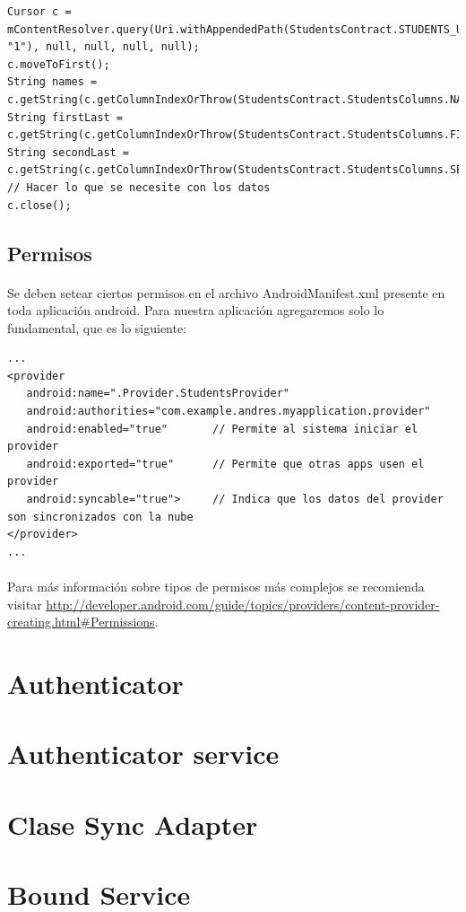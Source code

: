 \documentclass[10pt]{extarticle}
\begin{document}
\begin{lstlisting}
Cursor c = mContentResolver.query(Uri.withAppendedPath(StudentsContract.STUDENTS_URI, "1"), null, null, null, null);
c.moveToFirst();
String names = c.getString(c.getColumnIndexOrThrow(StudentsContract.StudentsColumns.NAMES));
String firstLast = c.getString(c.getColumnIndexOrThrow(StudentsContract.StudentsColumns.FIRST_LASTNAME));
String secondLast = c.getString(c.getColumnIndexOrThrow(StudentsContract.StudentsColumns.SECOND_LASTNAME));
// Hacer lo que se necesite con los datos
c.close();

\end{lstlisting}


\subsection{Permisos}

\paragraph{}
Se deben setear ciertos permisos en el archivo AndroidManifest.xml presente en toda aplicación android. Para nuestra aplicación agregaremos solo lo fundamental, que es lo siguiente:

\begin{lstlisting}
...
<provider
   android:name=".Provider.StudentsProvider"
   android:authorities="com.example.andres.myapplication.provider"
   android:enabled="true"		// Permite al sistema iniciar el provider
   android:exported="true"		// Permite que otras apps usen el provider
   android:syncable="true">		// Indica que los datos del provider son sincronizados con la nube
</provider>
...
\end{lstlisting}

\paragraph{}
Para más información sobre tipos de permisos más complejos se recomienda visitar \url{http://developer.android.com/guide/topics/providers/content-provider-creating.html\#Permissions}.

\section{Authenticator}


\section{Authenticator service}


\section{Clase Sync Adapter}


\section{Bound Service}
\end{document}
